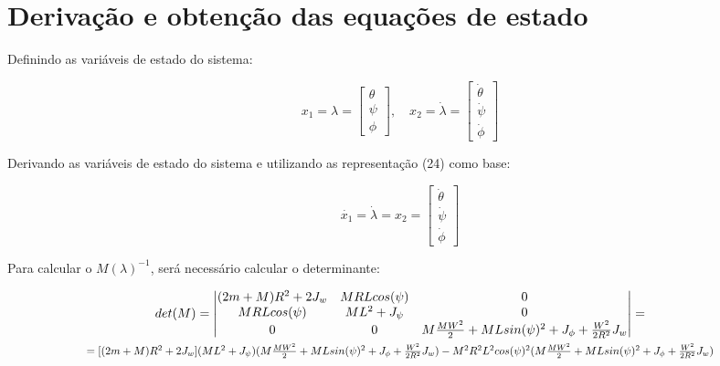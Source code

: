\documentclass[10pt]{article}
\begin{document}
\section{Derivação e obtenção das equações de estado}

\quad Definindo as variáveis de estado do sistema:

\begin{equation}
    x_1 = \lambda =
    \begin{bmatrix}
        \theta \\
        \psi \\
        \phi
    \end{bmatrix}, \quad
    x_2 = \dot\lambda = 
    \begin{bmatrix}
        \dot\theta \\
        \dot\psi \\
        \dot\phi
    \end{bmatrix}
\end{equation}

\quad Derivando as variáveis de estado do sistema e utilizando as representação (24) como base:

\begin{equation}
    \dot{x_1} = \dot\lambda = x_2 =
    \begin{bmatrix}
        \dot\theta \\
        \dot\psi \\
        \dot\phi
    \end{bmatrix}
\end{equation}

\quad Para calcular o $M(\lambda)^{-1}$, será necessário calcular o determinante:

\begin{equation}
\begin{gathered}
    det(M) = 
    \begin{vmatrix}
        (2m + M)R^2 + 2J_w & MRLcos(\psi) & 0 \\
        MRLcos(\psi) & ML^2 + J_\psi & 0 \\
        0 & 0 & M\frac{MW^2}{2} + MLsin(\psi)^2 + J_\phi + \frac{W^2}{2R^2}J_w \\
    \end{vmatrix} = \\
    \scalebox{0.85}{$
    = [(2m + M)R^2 + 2J_w](ML^2 + J_\psi)(M\frac{MW^2}{2} + MLsin(\psi)^2 + J_\phi + \frac{W^2}{2R^2}J_w) -  M^2R^2L^2cos(\psi)^2(M\frac{MW^2}{2} + MLsin(\psi)^2 + J_\phi + \frac{W^2}{2R^2}J_w)
    $}
\end{gathered}
\end{equation}
\end{document}
